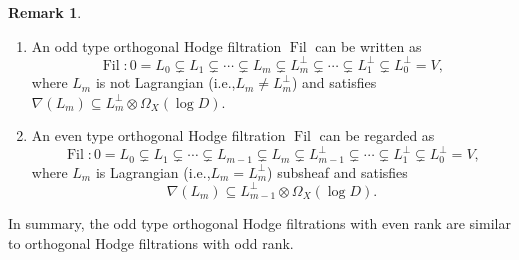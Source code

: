 \documentclass[11pt]{article}
\newcommand{\ie}{i.e.,\xspace}
\newcommand{\skpt}{\smallskip}
\numberwithin{equation}{section}
\DeclareMathOperator{\Filt}{Fil}
\theoremstyle{plain}
\theoremstyle{definition}
\newtheorem{rem}[thm]{Remark}
\begin{document}
\skpt
\begin{rem}
\begin{enumerate}
\item An odd type orthogonal Hodge filtration $\Filt$ can be written as
\[
\Filt: 0= L_0 \subsetneq L_1 \subsetneq \cdots \subsetneq L_m \subsetneq L_m^\perp\subsetneq\cdots \subsetneq L_1^\perp\subsetneq L_0^\perp= V,
\]
where $L_m$ is not Lagrangian (\ie $L_m\neq L_m^\perp$) and satisfies $\nabla(L_m)\subseteq L_m^\perp \otimes\Omega_X(\log D)$.

\item An even type orthogonal Hodge filtration $\Filt$ can be regarded as
\[
\Filt: 0= L_0 \subsetneq L_1 \subsetneq \cdots\subsetneq L_{m-1} \subsetneq L_m \subsetneq L_{m-1}^\perp\subsetneq\cdots \subsetneq L_1^\perp\subsetneq L_0^\perp= V,
\]
where $L_m$ is Lagrangian (\ie $L_m= L_m^\perp$) subsheaf and satisfies
\[
\nabla(L_m)\subseteq L_{m-1}^\perp \otimes\Omega_X(\log D).
\]
\end{enumerate}
In summary, the odd type orthogonal Hodge filtrations with even rank are similar to orthogonal Hodge filtrations with odd rank.
\end{rem}
\end{document}
